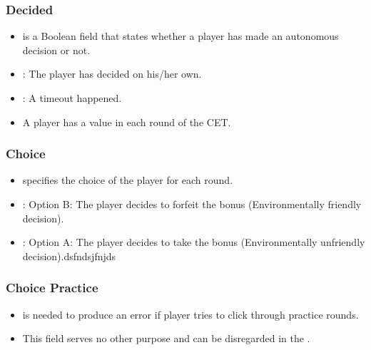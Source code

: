\documentclass[letterpaper,10pt,english]{sphinxmanual}
\begin{document}
\subsubsection{Decided}
\label{\detokenize{Player_fields:decided}}\begin{itemize}
\item {} 
 is a Boolean field that states whether a player has made an autonomous decision or not.

\item {} 
: The player has decided on his/her own.

\item {} 
: A timeout happened.

\item {} 
A player has a  value in each round of the CET.

\end{itemize}


\subsubsection{Choice}
\label{\detokenize{Player_fields:choice}}\begin{itemize}
\item {} 
 specifies the choice of the player for each round.

\item {} 
: Option B: The player decides to forfeit the bonus (Environmentally friendly decision).

\item {} 
: Option A: The player decides to take the bonus (Environmentally unfriendly decision).dsfndsjfnjds

\end{itemize}


\subsubsection{Choice Practice}
\label{\detokenize{Player_fields:choice-practice}}\begin{itemize}
\item {} 
 is needed to produce an error if player tries to click through practice rounds.

\item {} 
This field serves no other purpose and can be disregarded in the {\hyperref[\detokenize{output:output-ref}]{}}.

\end{itemize}
\end{document}
